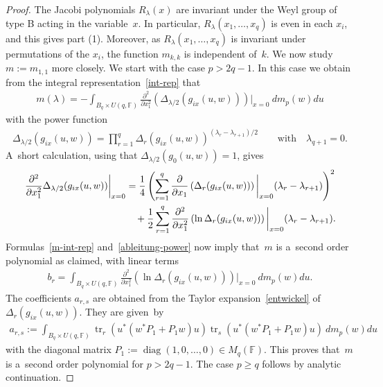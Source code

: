 \documentclass[pdftex]{sigma}
\numberwithin{equation}{section}
\DeclareMathOperator{\diag}{diag}
\begin{document}
\begin{proof}
The Jacobi polynomials $R_\lambda(x)$ are invariant under the Weyl group of type B acting in the variable~$x$.
In particular, $R_\lambda(x_1,\ldots,x_q)$ is even in each $x_i$, and this gives part (1).
Moreover, as $R_\lambda(x_1,\ldots,x_q)$ is invariant under permutations of the $x_i$, the function $m_{k,k}$ is
independent of~$k$.
We now study $m:=m_{1,1}$ more closely.
We start with the case $p> 2q-1$.
In this case we obtain from the integral representation~\eqref{int-rep} that
\begin{gather}
\label{m-int-rep}
m(\lambda)= -\int_{B_q\times U(q,\mathbb F)} \frac{\partial^2}{\partial x_1^2}\left(\Delta_{\lambda/2}(g_{ix}(u,w))\right)\bigg|_{x=0}\> dm_p(w)du
\end{gather}
with the power function
\begin{gather*}
\Delta_{\lambda/2}(g_{ix}(u,w)) =\prod\limits_{r=1}^q \Delta_r(g_{ix}(u,w))^{(\lambda_r-\lambda_{r+1})/2}
\qquad
\text{with}
\quad
\lambda_{q+1}=0.
\end{gather*}
A~short calculation, using that $\Delta_{\lambda/2}(g_0(u,w))=1$, gives
\begin{gather}
\frac{\partial^2}{\partial x_1^2} \Delta_{\lambda/2}(g_{ix}(u,w))\bigg|_{x=0}
=\frac{1}{4} \left(\sum\limits_{r=1}^q\frac{\partial}{\partial x_1}\left(\Delta_r(g_{ix}(u,w))\right)\bigg|_{x=0}
 (\lambda_r-\lambda_{r+1})\right)^2
\nonumber
\\
\hphantom{\frac{\partial^2}{\partial x_1^2} \Delta_{\lambda/2}(g_{ix}(u,w))\bigg|_{x=0}=}{}
+\frac{1}{2}\sum\limits_{r=1}^q \frac{\partial^2}{\partial x_1^2} \left(\ln \Delta_r(g_{ix}(u,w))\right)\bigg|_{x=0}
  (\lambda_r-\lambda_{r+1}).
\label{ableitung-power}
\end{gather}
Formulas~\eqref{m-int-rep} and~\eqref{ableitung-power} now imply that~$m$ is a~second order polynomial as claimed, with
linear terms
\begin{gather*}
b_r= \int_{B_q\times U(q,\mathbb F)} \frac{\partial^2}{\partial x_1^2} \left(\ln\Delta_r(g_{ix}(u,w))\right)\bigg|_{x=0}\> dm_p(w)du.
\end{gather*}
The coef\/f\/icients $a_{r,s}$ are obtained from the Taylor expansion~\eqref{entwickel} of $\Delta_r(g_{ix}(u,w))$. They are
given~by
\begin{gather}
\label{a_rs}
a_{r,s}:= \int_{B_q\times U(q,\mathbb F)} \operatorname{tr}_r(u^{*}(w^*P_1+ P_1  w)u) \operatorname{tr}_s(u^{*}(w^*P_1+ P_1  w)u)\>dm_p(w)du
\end{gather}
with the diagonal matrix $P_1:=\diag(1,0,\ldots,0)\in M_q(\mathbb F)$.
This proves that~$m$ is a~second order polynomial for $p>2q-1$.
The case $p\ge q$ follows by analytic continuation.


\end{proof}
\end{document}
